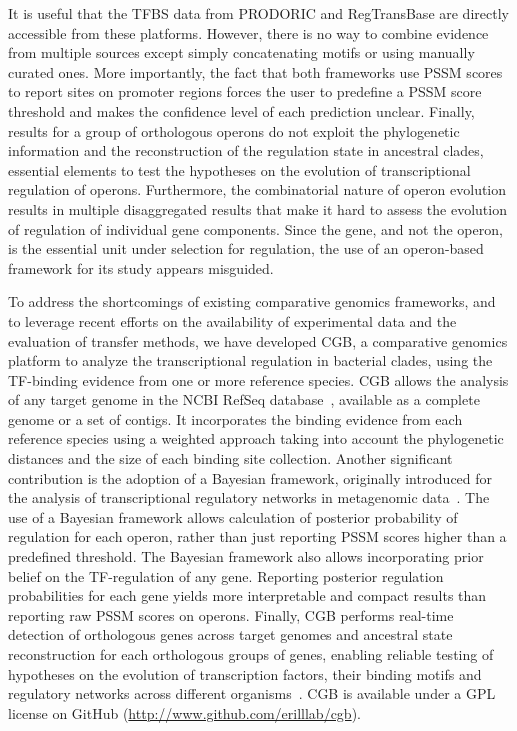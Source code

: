 It is useful that the TFBS data from PRODORIC and RegTransBase are directly
accessible from these platforms. However, there is no way to combine evidence
from multiple sources except simply concatenating motifs or using manually
curated ones. More importantly, the fact that both frameworks use PSSM scores
to report sites on promoter regions forces the user to predefine a PSSM score
threshold and makes the confidence level of each prediction unclear. Finally,
results for a group of orthologous operons do not exploit the phylogenetic
information and the reconstruction of the regulation state in ancestral clades,
essential elements to test the hypotheses on the evolution of transcriptional
regulation of operons. Furthermore, the combinatorial nature of operon
evolution results in multiple disaggregated results that make it hard to assess
the evolution of regulation of individual gene components. Since the gene, and
not the operon, is the essential unit under selection for regulation, the use
of an operon-based framework for its study appears misguided.

To address the shortcomings of existing comparative genomics frameworks, and to
leverage recent efforts on the availability of experimental data and the
evaluation of transfer methods, we have developed CGB, a comparative genomics
platform to analyze the transcriptional regulation in bacterial clades, using
the TF-binding evidence from one or more reference species. CGB allows the
analysis of any target genome in the NCBI RefSeq
database~\cite{o2015reference}, available as a complete genome or a set of
contigs. It incorporates the binding evidence from each reference species using
a weighted approach taking into account the phylogenetic distances and the size
of each binding site collection. Another significant contribution is the
adoption of a Bayesian framework, originally introduced for the analysis of
transcriptional regulatory networks in metagenomic
data~\cite{hobbs2016bayesian}. The use of a Bayesian framework allows
calculation of posterior probability of regulation for each operon, rather than
just reporting PSSM scores higher than a predefined threshold. The Bayesian
framework also allows incorporating prior belief on the TF-regulation of any
gene. Reporting posterior regulation probabilities for each gene yields more
interpretable and compact results than reporting raw PSSM scores on operons. Finally,
CGB performs real-time detection of orthologous genes across target genomes and
ancestral state
reconstruction for each orthologous groups of genes, enabling reliable testing
of hypotheses on the evolution of transcription factors, their binding motifs
and regulatory networks across different
organisms~\cite{pagel1999inferring}. CGB is available under a GPL license
on GitHub (\url{http://www.github.com/erilllab/cgb}).

